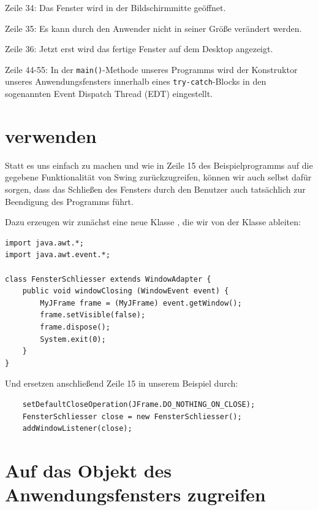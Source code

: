 \begin{compactitem}
\item[Zeile 34:] Das Fenster wird in der Bildschirmmitte geöffnet.

\item[Zeile 35:] Es kann durch den Anwender nicht in seiner Größe verändert
werden.

\item[Zeile 36:] Jetzt erst wird das fertige Fenster auf dem Desktop angezeigt.

\item[Zeile 44-55:] In der \lstinline|main()|-Methode unseres Programms wird der
Konstruktor unseres Anwendungsfensters innerhalb eines
\lstinline|try-catch|-Blocks in den sogenannten Event Dispatch Thread (EDT)
eingestellt.
\end{compactitem}


\section{ verwenden}

Statt es uns einfach zu machen und wie in Zeile 15 des Beispielprogramms auf
die gegebene Funktionalität von Swing zurückzugreifen, können wir auch selbst
dafür sorgen, dass das Schließen des Fensters durch den Benutzer auch
tatsächlich zur Beendigung des Programms führt.

Dazu erzeugen wir zunächst eine neue Klasse , die wir
von der Klasse  ableiten:

\begin{lstlisting}
import java.awt.*;
import java.awt.event.*;

class FensterSchliesser extends WindowAdapter {
    public void windowClosing (WindowEvent event) {
        MyJFrame frame = (MyJFrame) event.getWindow();
        frame.setVisible(false);
        frame.dispose();
        System.exit(0);
    }
}
\end{lstlisting}

Und ersetzen anschließend Zeile 15 in unserem Beispiel durch:

\begin{lstlisting}
    setDefaultCloseOperation(JFrame.DO_NOTHING_ON_CLOSE);
    FensterSchliesser close = new FensterSchliesser();
    addWindowListener(close);
\end{lstlisting}


\section{Auf das Objekt des Anwendungsfensters zugreifen}

